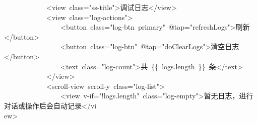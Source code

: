 \documentclass[a4paper,10pt]{article}
\begin{document}
{~~~~~~~~~~~~<view~class="ss-title">调试日志</view>\\
~~~~~~~~~~~~<view~class="log-actions">\\
~~~~~~~~~~~~~~~~<button~class="log-btn~primary"~@tap="refreshLogs">刷新</button>\\
~~~~~~~~~~~~~~~~<button~class="log-btn"~@tap="doClearLogs">清空日志</button>\\
~~~~~~~~~~~~~~~~<text~class="log-count">共~\{\{~logs.length~\}\}~条</text>\\
~~~~~~~~~~~~</view>\\
~~~~~~~~~~~~<scroll-view~scroll-y~class="log-list">\\
~~~~~~~~~~~~~~~~<view~v-if="!logs.length"~class="log-empty">暂无日志，进行对话或操作后会自动记录</vi\\
ew>
}

\newpage
\end{document}
